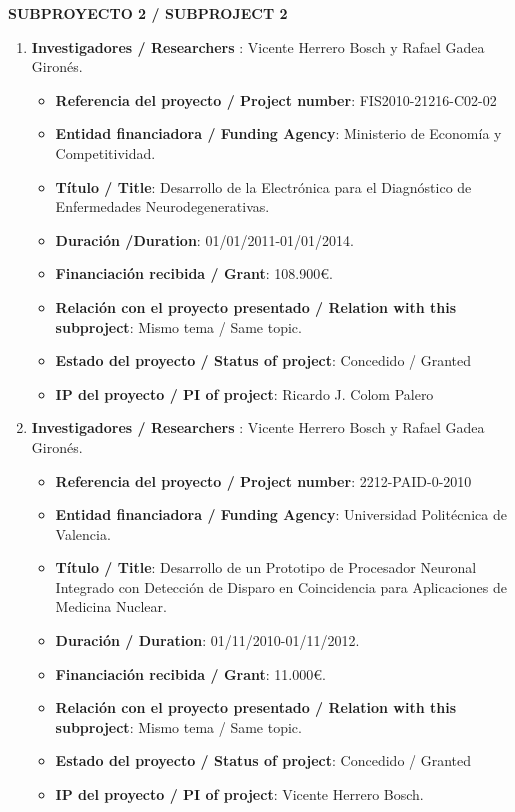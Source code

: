 \noindent\textbf{SUBPROYECTO 2 / SUBPROJECT 2}

\begin{enumerate}
\item {\bf Investigadores / Researchers }: Vicente Herrero Bosch y Rafael Gadea Giron\'es.
\begin{itemize}
\item {\bf Referencia del proyecto / Project number}: FIS2010-21216-C02-02
\item {\bf Entidad financiadora / Funding Agency}: Ministerio de Economía y Competitividad.
\item {\bf Título / Title}:  Desarrollo de la Electrónica para el Diagnóstico de Enfermedades Neurodegenerativas.
\item {\bf Duraci\'on /Duration}: 01/01/2011-01/01/2014.
\item {\bf Financiaci\'on recibida / Grant}: 108.900\euro. 
\item {\bf Relación con el proyecto presentado / Relation with this subproject}: Mismo tema / Same topic. 
\item {\bf Estado del proyecto / Status of project}: Concedido / Granted
\item {\bf IP del proyecto / PI of project}: Ricardo J. Colom Palero
\end{itemize}
\item {\bf Investigadores / Researchers }: Vicente Herrero Bosch y Rafael Gadea Giron\'es.
\begin{itemize}
\item {\bf Referencia del proyecto / Project number}: 2212-PAID-0-2010
\item {\bf Entidad financiadora / Funding Agency}: Universidad Politécnica de Valencia.
\item {\bf Título / Title}:  Desarrollo de un Prototipo de Procesador Neuronal Integrado con Detección de Disparo en Coincidencia para Aplicaciones de Medicina Nuclear.
\item {\bf Duraci\'on / Duration}: 01/11/2010-01/11/2012. 
\item {\bf Financiación recibida / Grant}: 11.000\euro. 
\item {\bf Relación con el proyecto presentado / Relation with this subproject}: Mismo tema / Same topic. 
\item {\bf Estado del proyecto / Status of project}: Concedido / Granted
\item {\bf IP del proyecto / PI of project}: Vicente Herrero Bosch.

\end{itemize}
\end{enumerate}
